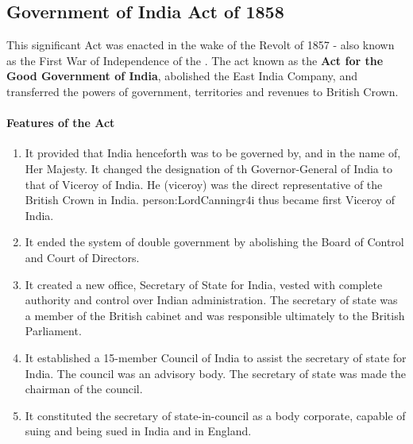 \subsection*{Government of India Act of 1858}

This significant Act was enacted in the wake of the Revolt of 1857 - also known as the First War of Independence of the . The act known as the \textbf{Act for the Good Government of India}, abolished the East India Company, and transferred the powers of government, territories and revenues to British Crown.

\paragraph{Features of the Act}
\begin{enumerate}
  \item It provided that India henceforth was to be governed by, and in the name of, Her Majesty. It changed the designation of th Governor-General of India to that of Viceroy of India. He (viceroy) was the direct representative of the British Crown in India. \gls{person:LordCanningr4i} thus became first Viceroy of India.
  \item It ended the system of double government by abolishing the Board of Control and Court of Directors.
  \item It created a new office, Secretary of State for India, vested with complete authority and control over Indian administration. The secretary of state was a member of the British cabinet and was responsible ultimately to the British Parliament.
  \item It established a 15-member Council of India to assist the secretary of state for India. The council was an advisory body. The secretary of state was made the chairman of the council.
  \item It constituted the secretary of state-in-council as a body corporate, capable of suing and being sued in India and in England.
\end{enumerate}



